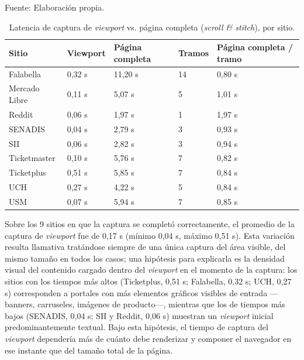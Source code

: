 \begin{table}[h]
    \centering
    \caption{\label{table:latenciacaptura} Latencia de captura de \textit{viewport} vs. página completa (\textit{scroll \& stitch}), por sitio.} Fuente: Elaboración propia.
    \begin{tabular}{|p{2.8cm}|p{1.9cm}|p{2.3cm}|p{1.4cm}|p{2.2cm}|}
        \hline
        \textbf{Sitio} & \textbf{Viewport} & \textbf{Página completa} & \textbf{Tramos} & \textbf{Página completa / tramo} \\
        \hline
        Falabella & 0,32 s & 11,20 s & 14 & 0,80 s \\
        \hline
        Mercado Libre & 0,11 s & 5,07 s & 5 & 1,01 s \\
        \hline
        Reddit & 0,06 s & 1,97 s & 1 & 1,97 s \\
        \hline
        SENADIS & 0,04 s & 2,79 s & 3 & 0,93 s \\
        \hline
        SII & 0,06 s & 2,82 s & 3 & 0,94 s \\
        \hline
        Ticketmaster & 0,10 s & 5,76 s & 7 & 0,82 s \\
        \hline
        Ticketplus & 0,51 s & 5,85 s & 7 & 0,84 s \\
        \hline
        UCH & 0,27 s & 4,22 s & 5 & 0,84 s \\
        \hline
        USM & 0,07 s & 5,94 s & 7 & 0,85 s \\
        \hline
    \end{tabular}
\end{table}

Sobre los 9 sitios en que la captura se completó correctamente, el promedio de la captura de \textit{viewport} fue de 0,17 s (mínimo 0,04 s, máximo 0,51 s). Esta variación resulta llamativa tratándose siempre de una única captura del área visible, del mismo tamaño en todos los casos; una hipótesis para explicarla es la densidad visual del contenido cargado dentro del \textit{viewport} en el momento de la captura: los sitios con los tiempos más altos (Ticketplus, 0,51 s; Falabella, 0,32 s; UCH, 0,27 s) corresponden a portales con más elementos gráficos visibles de entrada —banners, carruseles, imágenes de producto—, mientras que los de tiempos más bajos (SENADIS, 0,04 s; SII y Reddit, 0,06 s) muestran un \textit{viewport} inicial predominantemente textual. Bajo esta hipótesis, el tiempo de captura del \textit{viewport} dependería más de cuánto debe renderizar y componer el navegador en ese instante que del tamaño total de la página.

